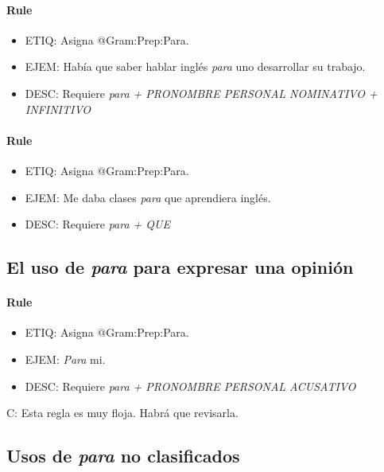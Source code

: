 \documentclass[11pt]{report}
\begin{document}
\paragraph*{Rule}
\begin{itemize}
\item ETIQ: Asigna @Gram:Prep:Para.
\item EJEM: Había que saber hablar inglés \emph{para} uno desarrollar su trabajo.
\item DESC: Requiere \emph{para + PRONOMBRE PERSONAL NOMINATIVO + INFINITIVO}
\end{itemize}

\paragraph*{Rule}
\begin{itemize}
\item ETIQ: Asigna @Gram:Prep:Para.
\item EJEM: Me daba clases \emph{para} que aprendiera inglés.
\item DESC: Requiere \emph{para + QUE}
\end{itemize}

\subsection{El uso de \emph{para} para expresar una opinión}
\paragraph*{Rule}
\begin{itemize}
\item ETIQ: Asigna @Gram:Prep:Para.
\item EJEM: \emph{Para} mi.
\item DESC: Requiere \emph{para + PRONOMBRE PERSONAL ACUSATIVO}
\end{itemize}

 C: Esta regla es muy floja. Habrá que revisarla.
\subsection{Usos de \emph{para} no clasificados}
\end{document}
